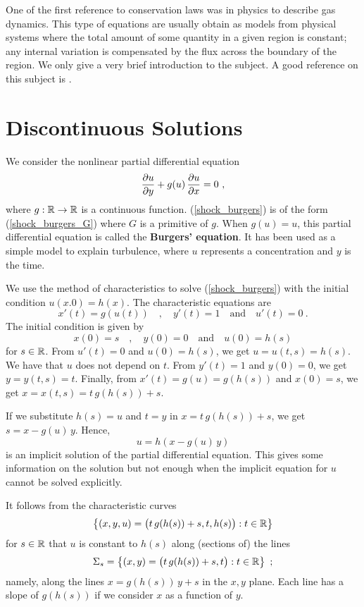 One of the first reference to conservation laws was in physics to
describe gas dynamics.  This type of equations are usually
obtain as models from physical systems where the total amount of some
quantity in a given region is constant; any internal variation is
compensated by the flux across the boundary of the region.
We only give a very brief introduction to the subject.  A good
reference on this subject is \cite{Smo}.

\section{Discontinuous Solutions} \label{sectShockIntro}

We consider the nonlinear partial differential equation
\begin{equation}\label{shock_burgers}
\frac{\partial{u}}{\partial y} + g(u)\, \frac{\partial{u}}{\partial x} = 0 \ ,
\end{equation}
where $g:\mathbb{R}\rightarrow \mathbb{R}$ is a continuous function.
(\ref{shock_burgers}) is of the form (\ref{shock_burgers_G}) where $G$
is a primitive of $g$.  When $g(u)=u$, this partial differential
equation is called the
{\bfseries Burgers' equation}.
It has been used as a simple model to explain turbulence, where $u$
represents a concentration and $y$ is the time.

We use the method of characteristics to solve
(\ref{shock_burgers}) with the initial condition $u(x.0) = h(x)$.
The characteristic equations are
\[
x'(t) = g(u(t)) \quad , \quad y'(t) = 1 \quad \text{and} \quad u'(t) = 0 \ .
\]
The initial condition is given by
\[
x(0) = s \quad , \quad y(0)=0 \quad \text{and} \quad u(0)=h(s)
\]
for $s \in \mathbb{R}$.  From $u'(t)=0$ and $u(0)=h(s)$, we get
$u = u(t,s) = h(s)$.  We have that $u$ does not depend on $t$.
From $y'(t)=1$ and $y(0)=0$, we get
$y = y(t,s) = t$.  Finally, from $x'(t)= g(u) = g(h(s))$ and
$x(0)=s$, we get $x = x(t,s) = t\,g(h(s))+s$. 

If we substitute $h(s) = u$ and $t=y$ in $x=t\,g(h(s))+s$, we get
$s=x-g(u)\,y$.  Hence,
\begin{equation}\label{shock_burgers_sol}
u=h(x-g(u)\,y)
\end{equation}
is an implicit solution of the partial differential equation.
This gives some information on the solution but not enough when the
implicit equation for $u$ cannot be solved explicitly.

It follows from the characteristic curves
\[
\left\{ (x,y,u) = \big(t\,g(h(s)) + s, t, h(s)\big) : t \in \mathbb{R} \right\}
\]
for $s\in \mathbb{R}$ that $u$ is constant to $h(s)$ along (sections of) the
lines
\[
\Sigma_s = \left\{ (x,y) = \big(t\,g(h(s)) + s, t \big) : t\in \RR\right\} \ ;
\]
namely, along the lines $x = g(h(s))\,y + s$ in the $x,y$ plane.  Each
line has a slope of $g(h(s))$ if we consider $x$ as a function of $y$.

